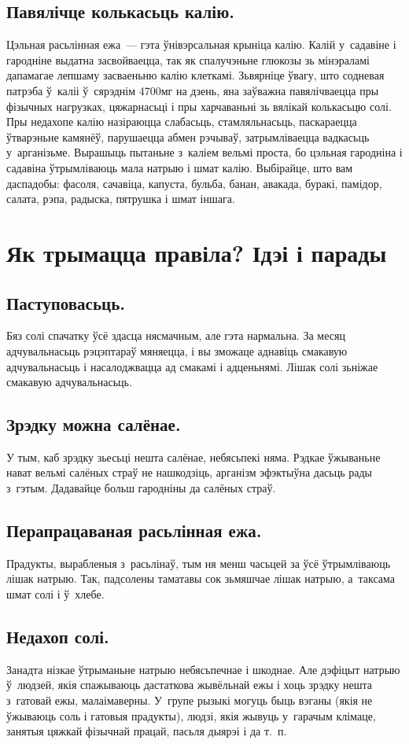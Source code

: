 \subsection{Павялічце колькасьць калію.}
Цэльная расьлінная ежа~--- гэта ўнівэрсальная крыніца калію. Калій у~садавіне і гародніне выдатна засвойваецца, так як спалучэньне глюкозы зь мінэраламі дапамагае лепшаму засваеньню калію клеткамі. Зьвярніце ўвагу, што содневая патрэба ў~каліі ў~сярэднім 4700мг на дзень, яна заўважна павялічваецца пры фізычных нагрузках, цяжарнасьці і пры харчаваньні зь вялікай колькасьцю солі. Пры недахопе калію назіраюцца слабасьць, стамляльнасьць, паскараецца ўтварэньне камянёў, парушаецца абмен рэчываў, затрымліваецца вадкасьць у~арганізьме. Вырашыць пытаньне з~каліем вельмі проста, бо цэльная гародніна і садавіна ўтрымліваюць мала натрыю і шмат калію. Выбірайце, што вам даспадобы: фасоля, сачавіца, капуста, бульба, банан, авакада, буракі, памідор, салата, рэпа, радыска, пятрушка і шмат іншага.

\section{Як трымацца правіла? Ідэі і парады}

\subsection{Паступовасьць.}
Бяз солі спачатку ўсё здасца нясмачным, але гэта нармальна. За месяц адчувальнасьць рэцэптараў мяняецца, і вы зможаце аднавіць смакавую адчувальнасьць і насалоджвацца ад смакамі і адценьнямі. Лішак солі зьніжае смакавую адчувальнасьць.

\subsection{Зрэдку можна салёнае.}
У тым, каб зрэдку зьесьці нешта салёнае, небясьпекі няма. Рэдкае ўжываньне нават вельмі салёных страў не нашкодзіць, арганізм эфэктыўна дасьць рады з~гэтым. Дадавайце больш гародніны да салёных страў.

\subsection{Перапрацаваная расьлінная ежа.}
Прадукты, вырабленыя з~расьлінаў, тым ня менш часьцей за ўсё ўтрымліваюць лішак натрыю. Так, падсолены таматавы сок зьмяшчае лішак натрыю, а~таксама шмат солі і ў~хлебе.

\subsection{Недахоп солі.}
Занадта нізкае ўтрыманьне натрыю небясьпечнае і шкоднае. Але дэфіцыт натрыю ў~людзей, якія спажываюць дастаткова жывёльнай ежы і хоць зрэдку нешта з~гатовай ежы, малаімаверны. У~групе рызыкі могуць быць вэганы (якія не ўжываюць соль і гатовыя прадукты), людзі, якія жывуць у~гарачым клімаце, занятыя цяжкай фізычнай працай, пасьля дыярэі і да т.~п.

